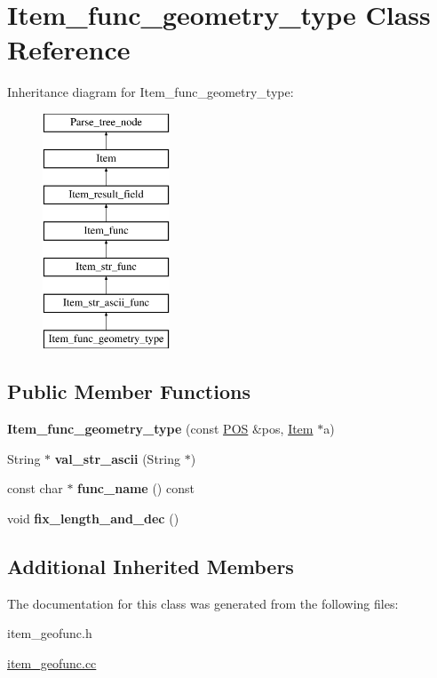 \hypertarget{classItem__func__geometry__type}{}\section{Item\+\_\+func\+\_\+geometry\+\_\+type Class Reference}
\label{classItem__func__geometry__type}
Inheritance diagram for Item\+\_\+func\+\_\+geometry\+\_\+type\+:\begin{figure}[H]
\begin{center}
\leavevmode
\includegraphics[height=7.000000cm]{classItem__func__geometry__type}
\end{center}
\end{figure}
\subsection*{Public Member Functions}
\begin{DoxyCompactItemize}
\item 
\mbox{\label{classItem__func__geometry__type_a005b8b950da44d5e4bf78fe92cf1daba}} 
{\bfseries Item\+\_\+func\+\_\+geometry\+\_\+type} (const \mbox{\hyperlink{structYYLTYPE}{P\+OS}} \&pos, \mbox{\hyperlink{classItem}{Item}} $\ast$a)
\item 
\mbox{\label{classItem__func__geometry__type_a1327d9e1451a518932c2d80aeafa2a61}} 
String $\ast$ {\bfseries val\+\_\+str\+\_\+ascii} (String $\ast$)
\item 
\mbox{\label{classItem__func__geometry__type_a94e133092ed05e82a03fafb5554f9c8b}} 
const char $\ast$ {\bfseries func\+\_\+name} () const
\item 
\mbox{\label{classItem__func__geometry__type_a8eb5a21fee12d52563498bed6963d339}} 
void {\bfseries fix\+\_\+length\+\_\+and\+\_\+dec} ()
\end{DoxyCompactItemize}
\subsection*{Additional Inherited Members}


The documentation for this class was generated from the following files\+:\begin{DoxyCompactItemize}
\item 
item\+\_\+geofunc.\+h\item 
\mbox{\hyperlink{item__geofunc_8cc}{item\+\_\+geofunc.\+cc}}\end{DoxyCompactItemize}
